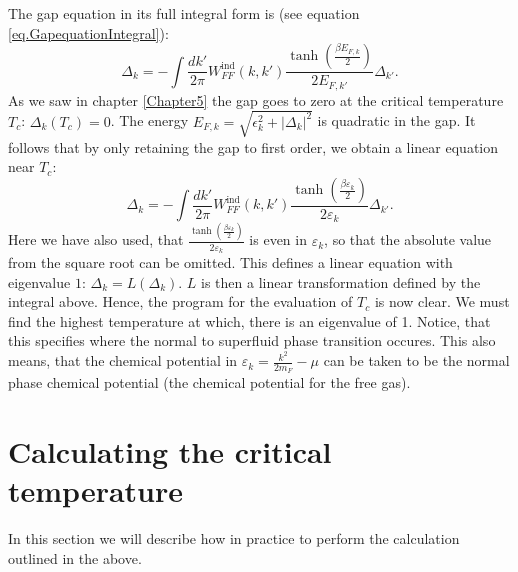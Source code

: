 The gap equation in its full integral form is (see equation \eqref{eq.GapequationIntegral}):
\begin{equation}
\Delta_k = - \int \frac{dk'}{2\pi} W^\text{ind}_{FF}(k,k')\frac{\tanh\left(\frac{\beta E_{F,k}}{2}\right)}{2E_{F,k'}}\Delta_{k'}. \nonumber
\end{equation} 
As we saw in chapter \ref{Chapter5} the gap goes to zero at the critical temperature $T_c$: $\Delta_k(T_c) = 0$. The energy $E_{F,k} = \sqrt{\epsilon_k^2 + |\Delta_k|^2}$ is quadratic in the gap. It follows that by only retaining the gap to first order, we obtain a linear equation near $T_c$:
\begin{equation}
\Delta_k = - \int \frac{dk'}{2\pi} W^\text{ind}_{FF}(k,k')\frac{\tanh\left(\frac{\beta \varepsilon_k}{2}\right)}{2\varepsilon_k} \Delta_{k'}.
\label{eq.GapequationIntegralLinear}
\end{equation} 
Here we have also used, that $\frac{\tanh\left(\frac{\beta \varepsilon_k}{2}\right)}{2\varepsilon_k}$ is even in $\varepsilon_k$, so that the absolute value from the square root can be omitted. This defines a linear equation with eigenvalue $1$: $\Delta_k = L(\Delta_k)$. $L$ is then a linear transformation defined by the integral above. Hence, the program for the evaluation of $T_c$ is now clear. We must find the highest temperature at which, there is an eigenvalue of 1. Notice, that this specifies where the normal to superfluid phase transition occures. This also means, that the chemical potential in $\varepsilon_k = \frac{k^2}{2m_F} - \mu$ can be taken to be the normal phase chemical potential (the chemical potential for the free gas). 

\section{Calculating the critical temperature} \label{sec.criticaltemperature.numerical}
In this section we will describe how in practice to perform the calculation outlined in the above. 

